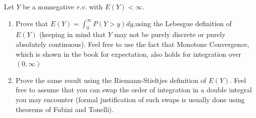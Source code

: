 \documentclass[
  letterpaper,
  DIV=11,
  numbers=noendperiod]{scrreprt}
\theoremstyle{definition}
\theoremstyle{plain}
\theoremstyle{remark}
\begin{document}
Let \(Y\) be a nonnegative \(r.v.\) with \(E(Y)< \infty\).

\begin{enumerate}
\def\labelenumi{(\alph{enumi})}
\item
  Prove that \(E(Y) =\int_0^\infty P(Y > y)dy\),using the Lebesgue
  definition of \(E(Y)\) (keeping in mind that \(Y\) may not be purely
  discrete or purely absolutely continuous). Feel free to use the fact
  that Monotone Convergence, which is shown in the book for expectation,
  also holds for integration over \((0,\infty)\)
\item
  Prove the same result using the Riemann-Stieltjes definition of
  \(E(Y)\). Feel free to assume that you can swap the order of
  integration in a double integral you may encounter (formal
  justification of such swaps is usually done using theorems of Fubini
  and Tonelli).
\end{enumerate}
\end{document}
